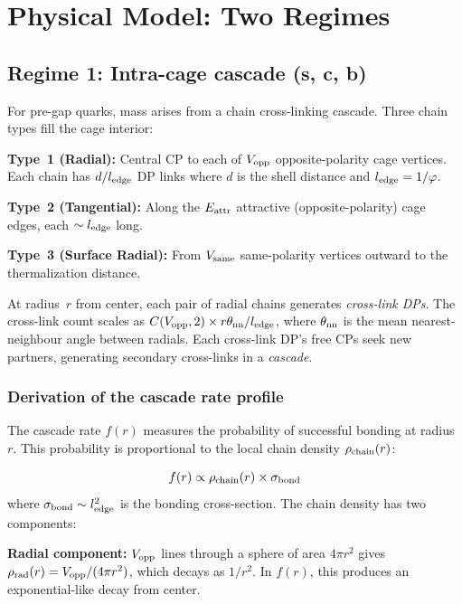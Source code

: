 \documentclass[11pt,letterpaper]{article}
\newcommand{\phig}{\varphi}
\begin{document}
\section{Physical Model: Two Regimes}
\label{sec:model}

\subsection{Regime 1: Intra-cage cascade (s, c, b)}

For pre-gap quarks, mass arises from a chain cross-linking
cascade.  Three chain types fill the cage interior:

\textbf{Type~1 (Radial):} Central CP to each of $V_{\rm opp}$
opposite-polarity cage vertices.  Each chain has $d/l_{\rm edge}$
DP links where $d$ is the shell distance and
$l_{\rm edge} = 1/\phig$.

\textbf{Type~2 (Tangential):} Along the $E_{\rm attr}$ attractive
(opposite-polarity) cage edges, each $\sim l_{\rm edge}$ long.

\textbf{Type~3 (Surface Radial):} From $V_{\rm same}$
same-polarity vertices outward to the thermalization distance.

At radius~$r$ from center, each pair of radial chains generates
\emph{cross-link DPs}.  The cross-link count scales as
$C(V_{\rm opp}, 2) \times r\theta_{\rm nn}/l_{\rm edge}$, where
$\theta_{\rm nn}$ is the mean nearest-neighbour angle between
radials.  Each cross-link DP's free CPs seek new partners,
generating secondary cross-links in a \emph{cascade}.

\subsubsection{Derivation of the cascade rate profile}

The cascade rate $f(r)$ measures the probability of successful
bonding at radius~$r$.  This probability is proportional to the
local chain density $\rho_{\rm chain}(r)$:

\begin{equation}
f(r) \propto \rho_{\rm chain}(r) \times \sigma_{\rm bond}
\end{equation}
where $\sigma_{\rm bond} \sim l_{\rm edge}^2$ is the bonding
cross-section.  The chain density has two components:

\textbf{Radial component:} $V_{\rm opp}$ lines through a sphere
of area $4\pi r^2$ gives
$\rho_{\rm rad}(r) = V_{\rm opp}/(4\pi r^2)$, which decays as
$1/r^2$.  In $f(r)$, this produces an exponential-like decay
from center.
\end{document}
